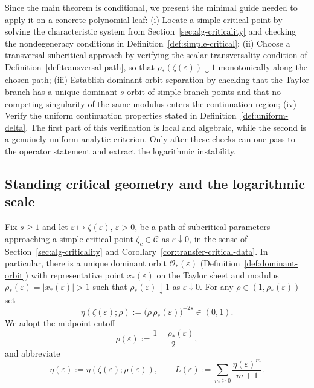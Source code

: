 \documentclass[11pt]{amsart}
\numberwithin{equation}{section}
\theoremstyle{plain}
\theoremstyle{definition}
\theoremstyle{remark}
\begin{document}
Since the main theorem is conditional, we present the minimal guide needed to
apply it on a concrete polynomial leaf: (i) Locate a simple critical point by
solving the characteristic system from Section~\ref{sec:alg-criticality} and
checking the nondegeneracy conditions in Definition~\ref{def:simple-critical}; (ii) Choose a transversal subcritical approach by
verifying the scalar transversality condition of Definition~\ref{def:transversal-path},
so that \(\rho_*(\zeta(\varepsilon))\downarrow1\) monotonically along the chosen path; (iii) Establish dominant-orbit separation by checking that the Taylor branch has a unique dominant \(s\)-orbit of simple branch points and that no competing singularity of the same modulus enters the continuation region; (iv) Verify the uniform continuation properties stated in
Definition~\ref{def:uniform-delta}. The first part of this verification is local and algebraic, while the second is a genuinely uniform analytic criterion. Only after these checks can one pass to the operator statement and extract the logarithmic instability.

\subsection{Standing critical geometry and the logarithmic scale}
\label{subsec:standing-eta}

Fix $s\ge1$ and let $\varepsilon\mapsto\zeta(\varepsilon)$,
$\varepsilon>0$, be a path of subcritical parameters approaching a
simple critical point $\zeta_c\in\mathcal C$ as
$\varepsilon\downarrow0$, in the sense of
Section~\ref{sec:alg-criticality} and
Corollary~\ref{cor:transfer-critical-data}.
In particular, there is a unique dominant orbit
$\mathcal O_*(\varepsilon)$
(Definition~\ref{def:dominant-orbit}) with representative point
$x_*(\varepsilon)$ on the Taylor sheet and modulus
$\rho_*(\varepsilon)=|x_*(\varepsilon)|>1$
such that $\rho_*(\varepsilon)\downarrow1$ as $\varepsilon\downarrow0$.
For any $\rho\in(1,\rho_*(\varepsilon))$ set
\begin{equation}\label{eq:eta-zeta-rho}
	\eta(\zeta(\varepsilon);\rho)
	:=\bigl(\rho\,\rho_*(\varepsilon)\bigr)^{-2s}\in(0,1).
\end{equation}
We adopt the midpoint cutoff
\begin{equation}\label{eq:rho-choice-midpoint}
	\rho(\varepsilon):=\frac{1+\rho_*(\varepsilon)}{2},
\end{equation}
and abbreviate
\begin{equation}\label{eq:eta-eps-abbrev}
	\eta(\varepsilon):=\eta(\zeta(\varepsilon);\rho(\varepsilon)),
	\qquad
	L(\varepsilon):=\sum_{m\ge0}\frac{\eta(\varepsilon)^m}{m+1}.
\end{equation}
\end{document}
